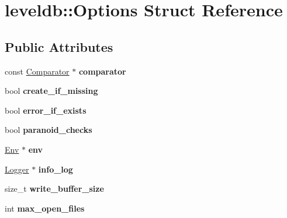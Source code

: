 \hypertarget{structleveldb_1_1_options}{}\section{leveldb\+:\+:Options Struct Reference}
\label{structleveldb_1_1_options}
\subsection*{Public Attributes}
\begin{DoxyCompactItemize}
\item 
\mbox{\label{structleveldb_1_1_options_a7522fbf79de73c4f73ef8d9392e8c80b}} 
const \mbox{\hyperlink{structleveldb_1_1_comparator}{Comparator}} $\ast$ {\bfseries comparator}
\item 
\mbox{\label{structleveldb_1_1_options_afe1b4e94164ff8f081b1c25bf1bcb62e}} 
bool {\bfseries create\+\_\+if\+\_\+missing}
\item 
\mbox{\label{structleveldb_1_1_options_aff3b99b1b30a2dba9642adc6c912d5b7}} 
bool {\bfseries error\+\_\+if\+\_\+exists}
\item 
\mbox{\label{structleveldb_1_1_options_a4263dcc655493100eecc9daf6737a10b}} 
bool {\bfseries paranoid\+\_\+checks}
\item 
\mbox{\label{structleveldb_1_1_options_aeb08bfe820e9c89f57446d6fbd2e6ea8}} 
\mbox{\hyperlink{classleveldb_1_1_env}{Env}} $\ast$ {\bfseries env}
\item 
\mbox{\label{structleveldb_1_1_options_af5545cba00b0e9763ad0279a74acc429}} 
\mbox{\hyperlink{classleveldb_1_1_logger}{Logger}} $\ast$ {\bfseries info\+\_\+log}
\item 
\mbox{\label{structleveldb_1_1_options_a017f1f9558e6b3887434df29a16dac97}} 
size\+\_\+t {\bfseries write\+\_\+buffer\+\_\+size}
\item 
\mbox{\label{structleveldb_1_1_options_a25c6ea125fc63342d8fc25b2f7817be4}} 
int {\bfseries max\+\_\+open\+\_\+files}

\end{DoxyCompactItemize}
